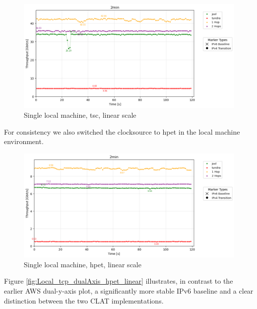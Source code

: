 \begin{figure}[H]
    \centering
    \includegraphics[width=1\textwidth]{resources/finalPlots/combinedplots/SingleLocal_tcp_sameScale_tsc_2min_linear.png}
    \caption{Single local machine, tsc, linear scale}
    \label{fig:Local_tcp_sameScale_tsc_linear}
\end{figure}

For consistency we also switched the clocksource to hpet in the local machine environment.

\begin{figure}[H]
    \centering
    \includegraphics[width=1\textwidth]{resources/finalPlots/combinedplots/SingleLocal_tcp_sameScale_hpet_2min_linear.png}
    \caption{Single local machine, hpet, linear scale}
    \label{fig:Local_tcp_sameScale_hpet_linear}
\end{figure}

Figure \ref{fig:Local_tcp_dualAxis_hpet_linear} illustrates, in contrast to the earlier AWS dual-y-axis plot, a significantly more stable IPv6 baseline and a clear distinction between the two CLAT implementations.

